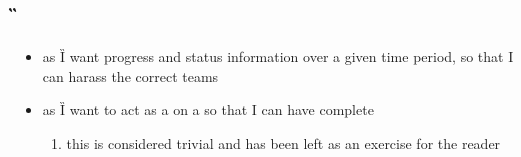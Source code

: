\documentclass[8pt,letterpaper]{article} %
\makeatletter
\newenvironment{branch}[1][2]{\begin{multicols}{#1}%
  \branch@start\c@enumi%
  \branch@end\c@enumi%
  }{%
  \ifnum\c@enumi<\branch@end%
    \global\c@enumi\branch@end%
  \fi%
\end{multicols}}
\newenvironment{slimlist}{
  \begin{itemize}
    \setlength{\topsep}{0pt}
    \setlength{\itemsep}{1pt}
    \setlength{\parsep}{0pt}
    \setlength{\parskip}{0pt}
}{\end{itemize}}
\newenvironment{mitemize}[1]{
  \subsection*{#1}
  \begin{slimlist}
}{
\end{slimlist}
\vspace{1em}
\pagebreak
}
\makeatother
\begin{document}
\begin{mitemize}{\G}

\item as \G I want progress and status information over a given time period, so that I can harass the correct teams
\item as \G I want to act as a \lev on a \sol so that I can have complete \rep
  \begin{enumerate}
  \item[] this is considered trivial and has been left as an exercise for the reader
  \end{enumerate}
  
\end{mitemize}
\end{document}
